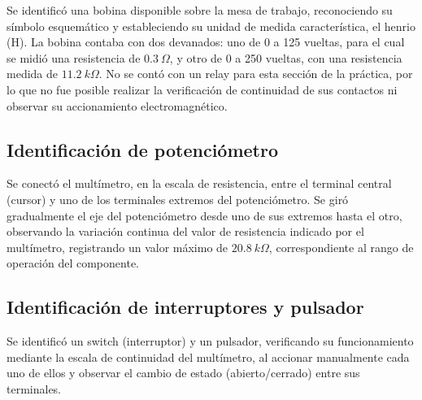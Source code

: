 Se identificó una bobina disponible sobre la mesa de trabajo, reconociendo su símbolo esquemático y estableciendo su unidad de medida característica, el henrio (H). La bobina contaba con dos devanados: uno de 0 a 125 vueltas, para el cual se midió una resistencia de $0.3~\Omega$, y otro de 0 a 250 vueltas, con una resistencia medida de $11.2~k\Omega$. No se contó con un relay para esta sección de la práctica, por lo que no fue posible realizar la verificación de continuidad de sus contactos ni observar su accionamiento electromagnético.


\subsection{Identificación de potenciómetro}

Se conectó el multímetro, en la escala de resistencia, entre el terminal central (cursor) y uno de los terminales extremos del potenciómetro. Se giró gradualmente el eje del potenciómetro desde uno de sus extremos hasta el otro, observando la variación continua del valor de resistencia indicado por el multímetro, registrando un valor máximo de $20.8~k\Omega$, correspondiente al rango de operación del componente.


\subsection{Identificación de interruptores y pulsador}

Se identificó un switch (interruptor) y un pulsador, verificando su funcionamiento mediante la escala de continuidad del multímetro, al accionar manualmente cada uno de ellos y observar el cambio de estado (abierto/cerrado) entre sus terminales.


